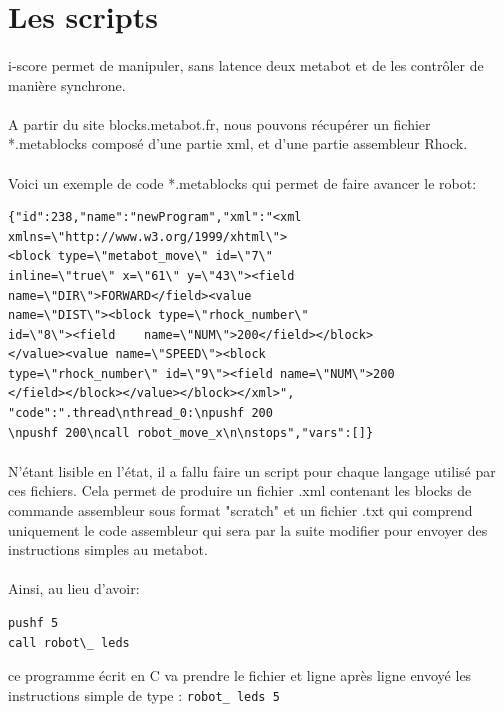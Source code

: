 \documentclass[10pt,a4paper]{report}
\begin{document}
\section{Les scripts}
\paragraph{}
i-score permet de manipuler, sans latence deux metabot et de les contrôler de manière synchrone.
\paragraph{}
A partir du site blocks.metabot.fr, nous pouvons récupérer un fichier *.metablocks composé d'une partie xml, et d'une partie assembleur Rhock.
\paragraph{}
Voici un exemple de code *.metablocks qui permet de faire avancer le robot:
\begin{verbatim}
{"id":238,"name":"newProgram","xml":"<xml
xmlns=\"http://www.w3.org/1999/xhtml\">
<block type=\"metabot_move\" id=\"7\"
inline=\"true\" x=\"61\" y=\"43\"><field
name=\"DIR\">FORWARD</field><value
name=\"DIST\"><block type=\"rhock_number\"
id=\"8\"><field    name=\"NUM\">200</field></block>
</value><value name=\"SPEED\"><block 
type=\"rhock_number\" id=\"9\"><field name=\"NUM\">200
</field></block></value></block></xml>",
"code":".thread\nthread_0:\npushf 200
\npushf 200\ncall robot_move_x\n\nstops","vars":[]}
\end{verbatim}
\paragraph{}
N'étant lisible en l'état, il a fallu faire un script pour chaque langage utilisé par ces fichiers. Cela permet de produire un fichier .xml contenant les blocks de commande assembleur sous format "scratch" et un fichier .txt qui comprend uniquement le code assembleur qui sera par la suite modifier pour envoyer des instructions simples au metabot.

\paragraph{}

Ainsi, au lieu d'avoir:
\begin{verbatim} 
pushf 5 
call robot\_ leds
\end{verbatim} 
ce programme écrit en C va prendre le fichier et ligne après ligne envoyé les instructions simple de type : 
\texttt{robot\_ leds 5}
\end{document}
